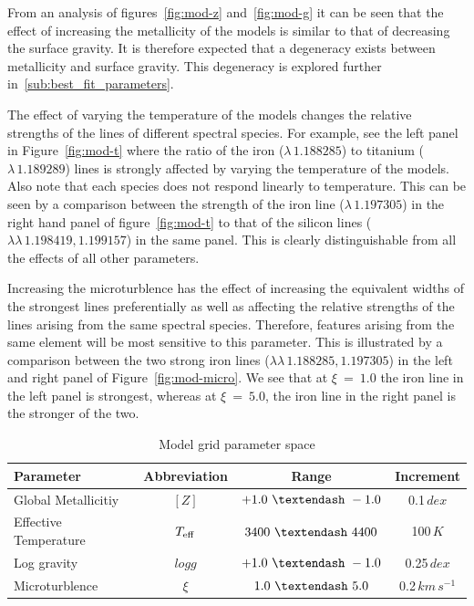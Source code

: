 From an analysis of figures~\ref{fig:mod-z} and~\ref{fig:mod-g} it can be seen that the effect of increasing the metallicity of the models is similar to that of decreasing the surface gravity.
It is therefore expected that a degeneracy exists between metallicity and surface gravity.
This degeneracy is explored further in~\ref{sub:best_fit_parameters}.

The effect of varying the temperature of the models changes the relative strengths of the lines of different spectral species.
For example, see the left panel in Figure~\ref{fig:mod-t} where the ratio of the iron
($\lambda\,1.188285$) to titanium ($\lambda\,1.189289$) lines is strongly affected by varying the temperature of the models.
Also note that each species does not respond linearly to temperature.
This can be seen by a comparison between the strength of the iron line
($\lambda\,1.197305$) in the right hand panel of figure~\ref{fig:mod-t} to that of the silicon lines
($\lambda\lambda\,1.198419, 1.199157$) in the same panel.
This is clearly distinguishable from all the effects of all other parameters.


Increasing the microturblence has the effect of increasing the equivalent widths
of the strongest lines preferentially as well as affecting the relative strengths of the lines arising from the same spectral species.
Therefore, features arising from the same element will be most sensitive to this
parameter.
This is illustrated by a comparison between the two strong iron lines
($\lambda\lambda\,1.188285, 1.197305$) in the left and
right panel of Figure~\ref{fig:mod-micro}.
We see that at $\xi~=~1.0$ the iron line in the left panel is strongest,
whereas at $\xi~=~5.0$, the iron line in the right panel is the stronger of the two.


\begin{table}
\caption{Model grid parameter space\label{tb:grid}}
\scriptsize
\begin{center}
\begin{tabular}{lccc}
 \hline
 \hline
Parameter & Abbreviation & Range & Increment \\
 \hline
Global Metallicitiy & $[Z]$ & $+1.0~\textendash~-1.0$ & 0.1\,$dex$ \\
Effective Temperature & $T_{\rm eff}$ & $3400 ~ \textendash~4400$ & 100\,$K$ \\
Log gravity & $log g$ & $+1.0~ \textendash~-1.0$ & 0.25\,$dex$ \\
Microturblence & $\xi$ & $1.0~ \textendash~5.0$ & 0.2\,$km\,s^{-1}$ \\
 \hline
\end{tabular}
\end{center}
\end{table}


